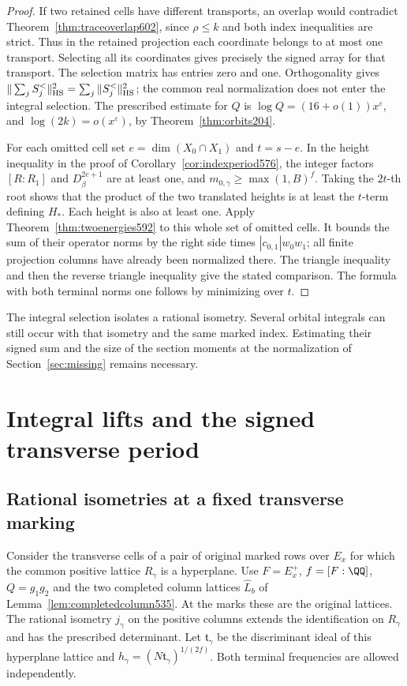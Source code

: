 \documentclass[a4paper,11pt]{article}
\theoremstyle{definition}
\theoremstyle{remark}
\numberwithin{equation}{section}
\begin{document}
\begin{proof}
If two retained cells have different transports, an overlap
would contradict Theorem~\ref{thm:traceoverlap602}, since
\(\rho\le k\) and both index inequalities are strict. Thus
in the retained projection each coordinate belongs to at most
one transport. Selecting all its coordinates gives precisely
the signed array for that transport. The selection matrix
has entries zero and one. Orthogonality gives
\(\|\sum_j S_j^{<}\|_{\rm HS}^2=\sum_j\|S_j^{<}\|_{\rm HS}^2\);
the common real normalization does not enter the integral
selection. The prescribed estimate for \(Q\) is
\(\log Q=(16+o(1))x^\varepsilon\), and \(\log(2k)=
o(x^\varepsilon)\), by Theorem~\ref{thm:orbits204}.

For each omitted cell set \(e=\dim(X_0\cap X_1)\) and
\(t=s-e\). In the height inequality in the proof of
Corollary~\ref{cor:indexperiod576}, the integer factors
\([R:R_1]\) and \(D_\beta^{2e+1}\) are at least one, and
\(m_{0,\gamma}\ge\max(1,B)^f\). Taking the \(2t\)-th root
shows that the product of the two translated heights is at
least the \(t\)-term defining \(H_*\). Each height is also at
least one. Apply Theorem~\ref{thm:twoenergies592} to this whole
set of omitted cells. It bounds the sum of their operator
norms by the right side times \(|c_{0,1}|w_0w_1\); all
finite projection columns have already been normalized there.
The triangle inequality and then the reverse triangle
inequality give the stated comparison. The formula with both
terminal norms one follows by minimizing over \(t\).
\end{proof}

The integral selection isolates a rational isometry. Several
orbital integrals can still occur with that isometry and the
same marked index. Estimating their signed sum and the size
of the section moments at the normalization of
Section~\ref{sec:missing} remains necessary.

\section{Integral lifts and the signed transverse period}\label{nav:chapter-signed-transverse-integrals}

\subsection{Rational isometries at a fixed transverse marking}
\label{sec:hyperplanerank603}

Consider the transverse cells of a pair of original marked rows
over \(E_x\) for which the common positive lattice \(R_\gamma\)
is a hyperplane. Use \(F=E_x^+\), \(f=[F:\QQ]\),
\(Q=g_1g_2\) and the two completed column lattices
\(\widehat L_b\) of Lemma~\ref{lem:completedcolumn535}.
At the marks these are the original lattices. The rational
isometry \(j_\gamma\) on the positive columns extends the
identification on \(R_\gamma\) and has the prescribed determinant.
Let \(\mathfrak t_\gamma\) be the discriminant ideal of this
hyperplane lattice and \(h_\gamma=(N\mathfrak t_\gamma)^{1/(2f)}\).
Both terminal frequencies are allowed independently.
\end{document}
